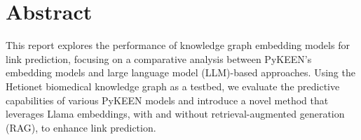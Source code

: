 \section*{Abstract}


This report explores the performance of knowledge graph embedding models for link prediction, focusing on a comparative analysis between PyKEEN's embedding models and large language model (LLM)-based approaches.
Using the Hetionet biomedical knowledge graph as a testbed, we evaluate the predictive capabilities of various PyKEEN models and introduce a novel method that leverages Llama embeddings, with and without retrieval-augmented generation (RAG), to enhance link prediction.